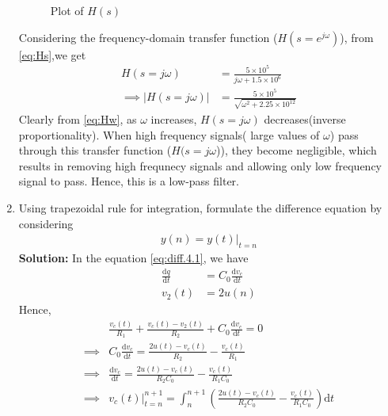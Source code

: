 \documentclass[journal,12pt,twocolumn]{IEEEtran}
\newcommand{\solution}{\noindent \textbf{Solution: }}
\providecommand{\brak}[1]{\ensuremath{\left(#1\right)}}
\providecommand{\der}[1]{\mathrm{d} #1}
\providecommand{\abs}[1]{\left\vert#1\right\vert}
\numberwithin{equation}{section}
\renewcommand\thesection{\arabic{section}}
\begin{document}
\begin{enumerate}[label=\thesection.\arabic*.,ref=\thesection.\theenumi]
\begin{figure}[!ht]
		\caption{Plot of $H(s)$}
		\label{fig-4.3}	
	\end{figure}
	Considering the frequency-domain transfer function ($H(s=e^{j\omega})$), from \eqref{eq:Hs},we get
	\begin{align}
		\label{eq:Hw}
		H(s=j\omega) &= \frac{5 \times 10^5}{j\omega + 1.5 \times 10^6} \\
		\implies \abs{H(s=j\omega)} &= \frac{5 \times 10^5}{\sqrt{\omega^2 + 2.25\times10^{12}}}
	\end{align}
Clearly from \eqref{eq:Hw}, as $\omega$ increases, $H(s=j\omega)$ decreases(inverse proportionality). When high frequency signals( large values of $\omega$) pass through this transfer function ($H(s=j\omega$)), they become negligible, which results in removing high frequnecy signals and allowing only low frequency signal to pass. Hence, this is a low-pass filter.
	\item Using trapezoidal rule for integration, formulate the difference equation by considering 
	\begin{align}
		y(n) = y(t)\vert_{t=n}
	\end{align}
	\solution
	In the equation \eqref{eq:diff.4.1}, we have
	\begin{align}
		\frac{\der{q}}{\der{t}}&=C_0\frac{\der{v_c}}{\der{t}}\\
		v_2(t)&=2u(n)
	\end{align} 
Hence,
	\begin{align}
		&\frac{v_c(t)}{R_1} + \frac{v_c(t) - v_2(t)}{R_2} + C_0\frac{\der{v_c}}{\der{t}} = 0 \\
		\implies &C_0\frac{\der{v_c}}{\der{t}} = \frac{2u(t)-v_c(t)}{R_2} - \frac{v_c(t)}{R_1} \\
		\implies &\frac{\der{v_c}}{\der{t}} = \frac{2u(t)-v_c(t)}{R_2 C_0} - \frac{v_c(t)}{R_1 C_0} \\
		\label{eq:trap}
		\implies &\left.v_c(t)\right|_{t=n}^{n+1} = \int_{n}^{n+1} \brak{\frac{2u(t)-v_c(t)}{R_2C_0} - \frac{v_c(t)}{R_1C_0}} \der{t}
	\end{align}
	

\end{enumerate}
\end{document}
